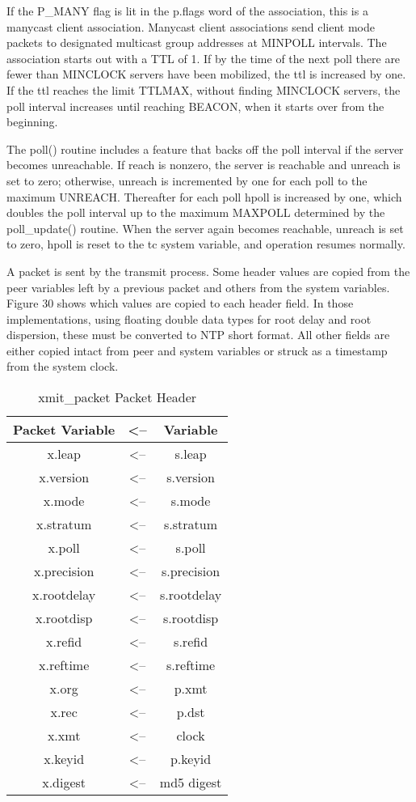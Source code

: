 If the P\_MANY flag is lit in the p.flags word of the association,
this is a manycast client association.  Manycast client associations
send client mode packets to designated multicast group addresses at
MINPOLL intervals.  The association starts out with a TTL of 1.  If
by the time of the next poll there are fewer than MINCLOCK servers
have been mobilized, the ttl is increased by one.  If the ttl reaches
the limit TTLMAX, without finding MINCLOCK servers, the poll interval
increases until reaching BEACON, when it starts over from the
beginning.

The poll() routine includes a feature that backs off the poll
interval if the server becomes unreachable.  If reach is nonzero, the
server is reachable and unreach is set to zero; otherwise, unreach is
incremented by one for each poll to the maximum UNREACH.  Thereafter
for each poll hpoll is increased by one, which doubles the poll
interval up to the maximum MAXPOLL determined by the poll\_update()
routine.  When the server again becomes reachable, unreach is set to
zero, hpoll is reset to the tc system variable, and operation resumes
normally.

A packet is sent by the transmit process.  Some header values are
copied from the peer variables left by a previous packet and others
from the system variables.  Figure 30 shows which values are copied
to each header field.  In those implementations, using floating
double data types for root delay and root dispersion, these must be
converted to NTP short format.  All other fields are either copied
intact from peer and system variables or struck as a timestamp from
the system clock.

\begin{table}[htb]
\center
\begin{tabular}{c | c | c}
Packet Variable & <-- & Variable \\
\hline
\hline
x.leap      & <-- & s.leap      \\
x.version   & <-- & s.version   \\
x.mode      & <-- & s.mode      \\
x.stratum   & <-- & s.stratum   \\
x.poll      & <-- & s.poll      \\
x.precision & <-- & s.precision \\
x.rootdelay & <-- & s.rootdelay \\
x.rootdisp  & <-- & s.rootdisp  \\
x.refid     & <-- & s.refid     \\
x.reftime   & <-- & s.reftime   \\
x.org       & <-- & p.xmt       \\
x.rec       & <-- & p.dst       \\
x.xmt       & <-- & clock       \\
x.keyid     & <-- & p.keyid     \\
x.digest    & <-- & md5 digest  \\
\hline
\end{tabular}
\label{xmit_packet_packet_header}
\caption{xmit\_packet Packet Header}
\end{table}

